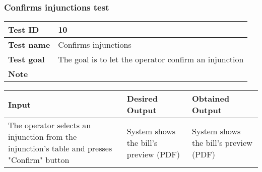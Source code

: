 {{		\subsubsection{Confirms injunctions test}{
			\begin{center}
			\begin{tabular}{|p{4cm}|p{10cm}|}
			\hline
				\centering \vspace{1mm} \bfseries{Test ID} \vspace{1mm} & 
				\vspace{1mm} 10 \vspace{1mm}\\
			\hline
				\centering \vspace{1mm} \bfseries{Test name} \vspace{1mm} & 
				\vspace{1mm} Confirms injunctions \vspace{1mm}\\
			\hline
				\centering \vspace{1mm} \bfseries{Test goal} \vspace{1mm} & 
				\vspace{1mm} The goal is to let the operator confirm an injunction\vspace{1mm}\\
			\hline
				\centering \vspace{1mm} \bfseries{Note} \vspace{1mm} & 
				\vspace{1mm}  \vspace{1mm}\\
			\hline
			\end{tabular}

			\begin{tabular}{|p{4cm}|p{5cm}|p{5cm}|}
			\hline
			\centering \vspace{1mm} \bfseries{Input} \vspace{1mm} & \vspace{1mm} \bfseries{Desired Output} \vspace{1mm} & \vspace{1mm} \bfseries{Obtained Output} \vspace{1mm}\\
			\hline
				\vspace{1mm} The operator selects an injunction from the injunction's table and presses "Confirm" button \vspace{1mm} &
				\vspace{1mm} System shows the bill's preview (PDF) \vspace{1mm} & 
				\vspace{1mm} System shows the bill's preview (PDF) \vspace{1mm} \\
			\hline
			\end{tabular}
			\end{center}
		}
		\clearpage

}}

